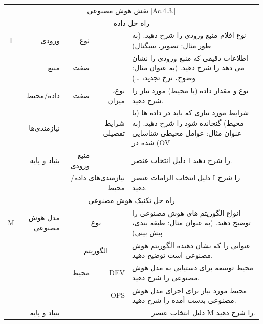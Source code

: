 \documentclass[a4paper,10pt]{article}
\begin{document}
\begin{itemize}
\begin{table}[htbp]
\begin{tabularx}{\textwidth}{c c c c X}
                            \vspace{-10pt}\\

                            \hline

                            \multicolumn{5}{c}{نقش هوش مصنوعی [Ac.4.3.]}\\
                            
                            \hline

                            \multicolumn{5}{c}{راه حل داده}\\

                            \multicolumn{1}{c}{I} & \multicolumn{1}{r}{ورودی} & \multicolumn{1}{r}{نوع} &  & نوع اقلام منبع ورودی را شرح دهید. (به طور مثال: تصویر، سیگنال) \\
                            & \multicolumn{1}{r}{منبع} & \multicolumn{1}{r}{صفت} &  & اطلاعات دقیقی که منبع ورودی را نشان می دهد را شرح دهید. (به عنوان مثال: وضوح، نرخ تجدید، \dots) \\
                            & \multicolumn{1}{r}{داده/محیط} & \multicolumn{1}{r}{صفت} & \multicolumn{1}{r}{نوع، میزان} & نوع و مقدار داده (یا محیط) مورد نیاز را شرح دهید. \\
                            & \multicolumn{1}{r}{نیازمندی‌ها} &  & \multicolumn{1}{r}{شرایط تفصیلی} & شرایط مورد نیازی که باید در داده ها (یا محیط) گنجانده شود را شرح دهید. (به عنوان مثال: عوامل محیطی شناسایی شده در (OV \\
                            & \multicolumn{1}{r}{بنیاد و پایه} & \multicolumn{1}{r}{منبع ورودی} &  & دلیل انتخاب عنصر I را شرح دهید. \\
                            &  & \multicolumn{2}{r}{نیازمندی‌های داده/محیط} & دلیل انتخاب الزامات عنصر I را شرح دهید. \\

                            \multicolumn{5}{c}{راه حل تکنیک هوش مصنوعی}\\

                            \multicolumn{1}{c}{M} & \multicolumn{1}{r}{مدل هوش مصنوعی} & \multicolumn{2}{c}{نوع} & انواع الگوریتم های هوش مصنوعی را توضیح دهید. (به عنوان مثال: طبقه بندی، پیش بینی) \\
                            &  & \multicolumn{2}{c}{الگوریتم} & عنوانی را که نشان دهنده الگوریتم هوش مصنوعی است توضیح دهید. \\
                            &  & \multicolumn{1}{r}{محیط} & \multicolumn{1}{r}{DEV} & محیط توسعه برای دستیابی به مدل هوش مصنوعی را شرح دهید. \\
                            &  &  & \multicolumn{1}{r}{OPS} & محیط مورد نیاز برای اجرای مدل هوش مصنوعی بدست آمده را شرح دهید. \\
                            & \multicolumn{1}{r}{بنیاد و پایه} & \multicolumn{3}{r}{دلیل انتخاب عنصر M را شرح دهید.} \\


\end{tabularx}
\end{table}
\end{itemize}
\end{document}
